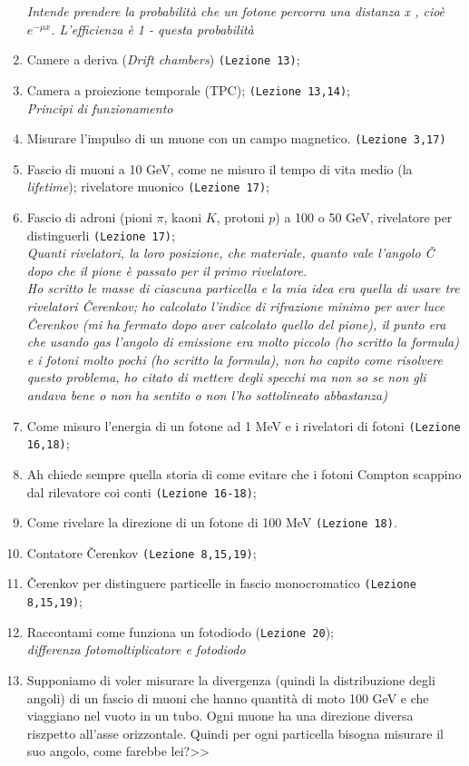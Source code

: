 \documentclass[../main.tex]{subfiles}
\begin{document}
\begin{enumerate}
    \textit{Intende prendere la probabilità che un fotone percorra una distanza x , cioè  $e^{-\mu x}$. L'efficienza è 1 - questa probabilità}
    \item Camere a deriva (\textit{Drift chambers}) \texttt{(Lezione 13)};
    \item Camera a proiezione temporale (TPC); \texttt{(Lezione 13,14)};\\
    \textit{Principi di funzionamento}
    \item Misurare l'impulso di un muone con un campo magnetico. \texttt{(Lezione 3,17)}
    \item Fascio di muoni a 10 GeV, come ne misuro il tempo di vita medio (la \textit{lifetime}); rivelatore muonico \texttt{(Lezione 17)}; 
    \item Fascio di adroni (pioni $\pi$, kaoni $K$, protoni $p$) a 100 o 50 GeV, rivelatore per distinguerli \texttt{(Lezione 17)};\\
    \textit{Quanti rivelatori, la loro posizione, che materiale, quanto vale l'angolo Č dopo che il pione è passato per il primo rivelatore.\\ Ho scritto le masse di ciascuna particella e la mia idea era quella di usare tre rivelatori Čerenkov; ho calcolato l'indice di rifrazione minimo per aver luce Čerenkov (mi ha fermato dopo aver calcolato quello del pione), il punto era che usando gas l'angolo di emissione era molto piccolo (ho scritto la formula) e i fotoni molto pochi (ho scritto la formula), non ho capito come risolvere questo problema, ho citato di mettere degli specchi ma non so se non gli andava bene o non ha sentito o non l'ho sottolineato abbastanza)}
    \item Come misuro l’energia di un fotone ad 1 MeV e i rivelatori di fotoni \texttt{(Lezione 16,18)};
    \item Ah chiede sempre quella storia di come evitare che i fotoni Compton scappino dal rilevatore coi conti \texttt{(Lezione 16-18)};
    \item Come rivelare la direzione di un fotone di 100 MeV \texttt{(Lezione 18)}.
    \item Contatore Čerenkov \texttt{(Lezione 8,15,19)};
    \item Čerenkov per distinguere particelle in fascio monocromatico \texttt{(Lezione 8,15,19)};
    \item Raccontami come funziona un fotodiodo (\texttt{Lezione 20});\\\textit{differenza fotomoltiplicatore e fotodiodo}
    \item Supponiamo di voler misurare la divergenza (quindi la distribuzione degli angoli) di un fascio di muoni che hanno quantità di moto 100 GeV e che viaggiano nel vuoto in un tubo. Ogni muone ha una direzione diversa riszpetto all'asse orizzontale. Quindi per ogni particella bisogna misurare il suo angolo, come farebbe lei?>>

\end{enumerate}
\end{document}
